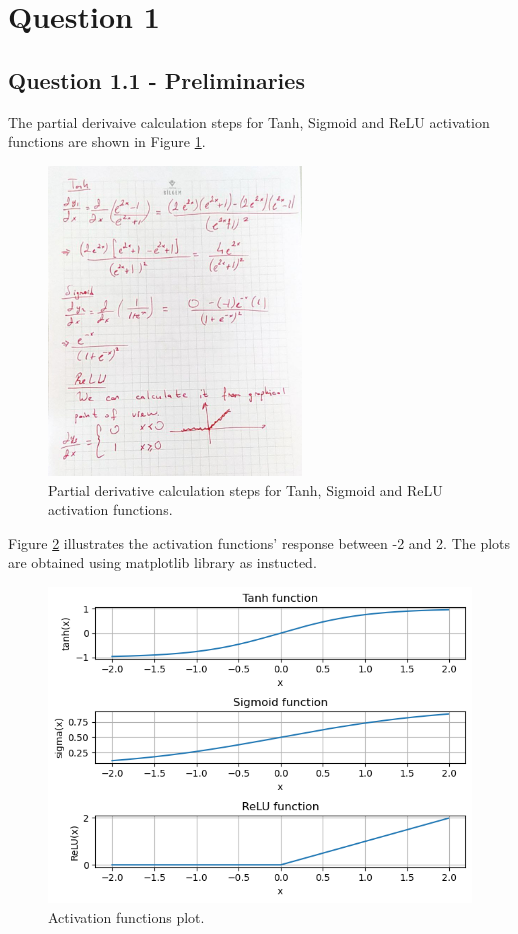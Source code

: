 \documentclass{assignment}
\date{\today}
\begin{document}
\section{Question 1}

\subsection{Question 1.1 - Preliminaries}
The partial derivaive calculation steps for Tanh, Sigmoid and ReLU activation functions are shown in Figure \ref{partial_der}.
\begin{figure}[htbp!]
    \centering
    \includegraphics[width=0.6\textwidth]{figures/partial_der.jpg}
    \caption{Partial derivative calculation steps for Tanh, Sigmoid and ReLU activation functions.}
    \label{partial_der}
\end{figure}

Figure \ref{fig:activation_functions} illustrates the activation functions' response between -2 and 2. The plots are obtained using matplotlib library as instucted.

\begin{figure}[htbp!]
    \centering
    \includegraphics[width=1\textwidth]{figures/q1_1.png}
    \caption{Activation functions plot.}
    \label{fig:activation_functions}
\end{figure}
\end{document}
